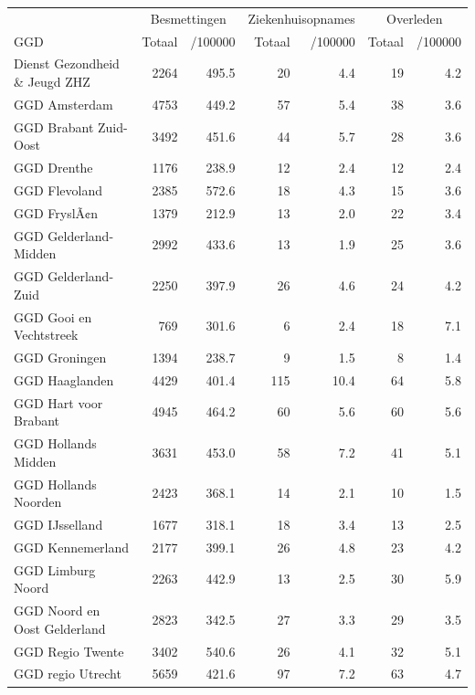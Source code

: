 \documentclass[
  english,
  man,floatsintext]{apa6}
\begin{document}
\begin{table}[H]
\centering\begingroup\fontsize{10}{12}\selectfont

\begin{threeparttable}
\begin{tabular}{lrrrrrr}
\toprule
\multicolumn{1}{c}{ } & \multicolumn{2}{c}{Besmettingen} & \multicolumn{2}{c}{Ziekenhuisopnames} & \multicolumn{2}{c}{Overleden} \\
\cmidrule(l{3pt}r{3pt}){2-3} \cmidrule(l{3pt}r{3pt}){4-5} \cmidrule(l{3pt}r{3pt}){6-7}
GGD & Totaal & /100000 & Totaal & /100000 & Totaal & /100000\\
\midrule
Dienst Gezondheid \& Jeugd ZHZ & 2264 & 495.5 & 20 & 4.4 & 19 & 4.2\\
GGD Amsterdam & 4753 & 449.2 & 57 & 5.4 & 38 & 3.6\\
GGD Brabant Zuid-Oost & 3492 & 451.6 & 44 & 5.7 & 28 & 3.6\\
GGD Drenthe & 1176 & 238.9 & 12 & 2.4 & 12 & 2.4\\
GGD Flevoland & 2385 & 572.6 & 18 & 4.3 & 15 & 3.6\\
GGD FryslÃ¢n & 1379 & 212.9 & 13 & 2.0 & 22 & 3.4\\
GGD Gelderland-Midden & 2992 & 433.6 & 13 & 1.9 & 25 & 3.6\\
GGD Gelderland-Zuid & 2250 & 397.9 & 26 & 4.6 & 24 & 4.2\\
GGD Gooi en Vechtstreek & 769 & 301.6 & 6 & 2.4 & 18 & 7.1\\
GGD Groningen & 1394 & 238.7 & 9 & 1.5 & 8 & 1.4\\
GGD Haaglanden & 4429 & 401.4 & 115 & 10.4 & 64 & 5.8\\
GGD Hart voor Brabant & 4945 & 464.2 & 60 & 5.6 & 60 & 5.6\\
GGD Hollands Midden & 3631 & 453.0 & 58 & 7.2 & 41 & 5.1\\
GGD Hollands Noorden & 2423 & 368.1 & 14 & 2.1 & 10 & 1.5\\
GGD IJsselland & 1677 & 318.1 & 18 & 3.4 & 13 & 2.5\\
GGD Kennemerland & 2177 & 399.1 & 26 & 4.8 & 23 & 4.2\\
GGD Limburg Noord & 2263 & 442.9 & 13 & 2.5 & 30 & 5.9\\
GGD Noord en Oost Gelderland & 2823 & 342.5 & 27 & 3.3 & 29 & 3.5\\
GGD Regio Twente & 3402 & 540.6 & 26 & 4.1 & 32 & 5.1\\
GGD regio Utrecht & 5659 & 421.6 & 97 & 7.2 & 63 & 4.7\\

\end{tabular}
\end{threeparttable}
\end{table}
\end{document}
